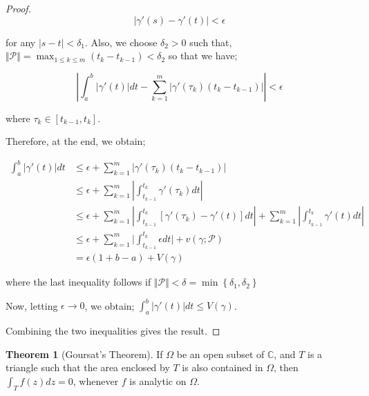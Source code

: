 \documentclass[12pt]{article}
\newcommand{\C}{\mathbb{C}}
\theoremstyle{definition}
\newtheorem{thm}{Theorem}
\newenvironment{theorem}{
\begin{tcolorbox}[colback=green!5!white,colframe=green!75!black, parbox = false]\begin{thm} }{\end{thm}\end{tcolorbox} }
\begin{document}
\begin{proof}
    $$\vert \gamma'(s) - \gamma'(t) \vert < \epsilon$$

    for any $\vert s - t \vert < \delta_1$. Also, we choose $\delta_2 > 0$ such that, $\Vert \mathcal{P}\Vert = \max_{1 \leq k \leq m} (t_k - t_{k-1}) < \delta_2$ so that we have;

    $$\left\vert \int_{a}^{b} \vert \gamma'(t) \vert dt - \sum_{k=1}^{m} \vert \gamma'(\tau_k) (t_k - t_{k-1}) \vert \right\vert < \epsilon$$

    where $\tau_k \in [t_{k-1}, t_k]$. 

    Therefore, at the end, we obtain;

    \begin{align*}
        \int_{a}^{b} \vert \gamma'(t) \vert dt
        & \leq \epsilon + \sum_{k=1}^{m} \vert \gamma'(\tau_k) (t_k - t_{k-1}) \vert\\
        & \leq \epsilon + \sum_{k=1}^{m} \left\vert \int_{t_{k-1}}^{t_k} \gamma'(\tau_k) dt \right\vert\\
        & \leq \epsilon + \sum_{k=1}^{m} \left\vert \int_{t_{k-1}}^{t_k} \left[\gamma'(\tau_k) - \gamma'(t)\right] dt \right\vert + \sum_{k=1}^{m} \left\vert \int_{t_{k-1}}^{t_k} \gamma'(t) dt \right\vert \\
        & \leq \epsilon + \sum_{k=1}^{m} \vert \int_{t_{k-1}}^{t_k} \epsilon dt \vert + v(\gamma; \mathcal{P})\\
        & = \epsilon (1 + b - a) + V(\gamma)
    \end{align*}

    where the last inequality follows if $\Vert \mathcal{P} \Vert < \delta = \min\left\{ \delta_1, \delta_2 \right\}$

    Now, letting $\epsilon \rightarrow 0$, we obtain; $\int_{a}^{b} \vert \gamma'(t) \vert dt \leq V(\gamma)$. 

    Combining the two inequalities gives the result.
\end{proof}

\begin{theorem}[Goursat's Theorem]
    If $\Omega$ be an open subset of $\C$, and $T$ is a triangle such that the area enclosed by $T$ is also contained in $\Omega$, then $\int_{T} f(z)dz = 0$, whenever $f$ is analytic on $\Omega$.
\end{theorem}
\end{document}
